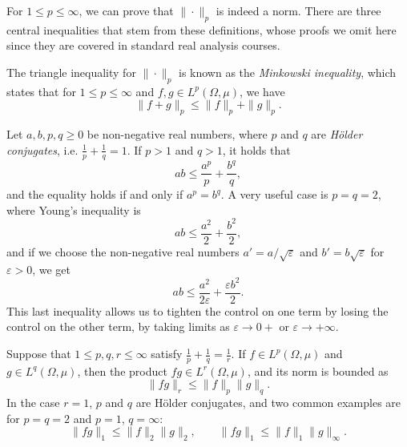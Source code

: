 For $1\leq p\leq \infty$, we can prove that $\|\cdot\|_p$ is indeed a norm. There are three central inequalities that stem from these definitions, whose proofs we omit here since they are covered in standard real analysis courses. 
\begin{theorem}
    The triangle inequality for $\|\cdot\|_p$ is known as the \emph{Minkowski inequality}, which states that for $1\leq p\leq \infty$ and $f,g\in L^p(\Omega,\mu)$, we have
    \begin{equation}
        \|f+g\|_p \leq \|f\|_p + \|g\|_p.
    \end{equation}
\end{theorem}
\begin{theorem}\label{thm:young-inequality}
    Let $a,b,p,q\geq 0$ be non-negative real numbers, where $p$ and $q$ are \emph{Hölder conjugates}, i.e. $\frac{1}{p}+\frac{1}{q}=1$. If $p>1$ and $q>1$, it holds that 
    \begin{equation}
        ab\leq \frac{a^p}{p} + \frac{b^q}{q},
    \end{equation}
    and the equality holds if and only if $a^p=b^q$. A very useful case is $p=q=2$, where Young's inequality is 
    \begin{equation}
        ab\leq \frac{a^2}{2}+\frac{b^2}{2},
    \end{equation}
    and if we choose the non-negative real numbers $a'=a/\sqrt{\varepsilon}$ and $b'=b\sqrt{\varepsilon}$ for $\varepsilon>0$, we get
    \begin{equation}
        ab\leq \frac{a^2}{2\varepsilon} + \frac{\varepsilon b^2}{2}.
    \end{equation}
    This last inequality allows us to tighten the control on one term by losing the control on the other term, by taking limits as $\varepsilon\to 0+$ or $\varepsilon\to+\infty$. 
\end{theorem}
\begin{theorem}
    Suppose that $1\leq p,q,r\leq \infty$ satisfy $\frac{1}{p}+\frac{1}{q}=\frac{1}{r}$. If $f\in L^p(\Omega,\mu)$ and $g\in L^q(\Omega,\mu)$, then the product $fg\in L^r(\Omega,\mu)$, and its norm is bounded as 
    \begin{equation}
        \|fg\|_r \leq \|f\|_p\|g\|_q.
    \end{equation}
    In the case $r=1$, $p$ and $q$ are Hölder conjugates, and two common examples are for $p=q=2$ and $p=1$, $q=\infty$:
    \begin{equation*}
        \|fg\|_1 \leq \|f\|_2\|g\|_2,\qquad \|fg\|_1 \leq \|f\|_1\|g\|_\infty.
    \end{equation*}
\end{theorem}

